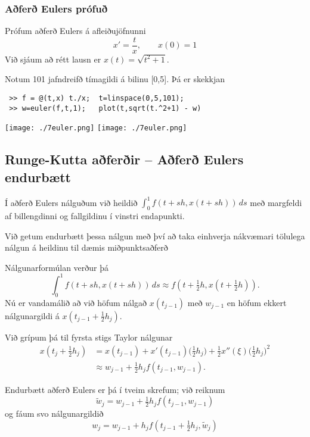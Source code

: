 \documentclass[icelandic,a4paper,12pt]{article}
\begin{document}
\subsubsection{Aðferð Eulers prófuð}
Prófum aðferð Eulers á afleiðujöfnunni
$$
  x' = \frac tx, \qquad x(0) = 1
$$
Við sjáum að rétt lausn er $x(t) = \sqrt{t^2+ 1}$.\pause

Notum 101 jafndreifð tímagildi á bilinu [0,5]. Þá er skekkjan
 \begin{verbatim}
 >> f = @(t,x) t./x;  t=linspace(0,5,101);
 >> w=euler(f,t,1);   plot(t,sqrt(t.^2+1) - w)
 \end{verbatim}

{\texttt{[image: ./7euler.png]}}
{\texttt{[image: ./7euler.png]}}



\subsection{Runge-Kutta aðferðir  -- Aðferð Eulers endurbætt} 
Í aðferð Eulers nálguðum við heildið $\int_0^1 f(t+sh,x(t+sh))\, ds$
með margfeldi af billengdinni og fallgildinu í vinstri endapunkti.

\smallskip
Við getum endurbætt þessa nálgun með því að taka 
einhverja nákvæmari tölulega nálgun á heildinu til dæmis 
miðpunktsaðferð 

\pause
\smallskip
Nálgunarformúlan verður þá
$$
\int_0^1f(t+sh,x(t+sh))\, ds \approx f(t+\tfrac 12h,x(t+\tfrac 12 h)). 
$$
Nú er vandamálið að við höfum nálgað $x(t_{j-1})$ með $w_{j-1}$ en
höfum ekkert nálgunargildi á $x(t_{j-1}+\frac 12 h_j)$.  

\pause
\smallskip 
Við grípum þá til
fyrsta stigs Taylor nálgunar
\begin{align*}
x(t_j+\tfrac 12 h_j)&=x(t_{j-1})+x'(t_{j-1})\big(\tfrac 12 h_j \big)
+\tfrac 12x''(\xi)\big(\tfrac 12 h_j \big)^2\\
&\approx w_{j-1}+\tfrac 12 h_jf(t_{j-1},w_{j-1}).
\end{align*}



Endurbætt aðferð Eulers er þá í tveim skrefum; við
reiknum 
\begin{equation*}
  \tilde w_j = w_{j-1} + \tfrac 12 h_j f(t_{j-1},w_{j-1})
\end{equation*}
og fáum svo nálgunargildið
\begin{equation*}
  w_j = w_{j-1} + h_jf\left(
    t_{j-1}+\tfrac 12 h_j,\tilde w_j\right)
\end{equation*}
\end{document}
